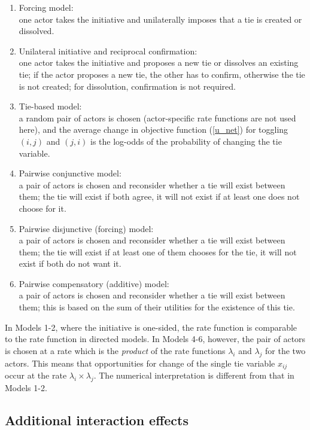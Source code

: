 \documentclass[a4paper,fleqn]{article}
\newcommand{\+}{\, + \,}
\begin{document}
{\begin{enumerate}
\item Forcing model: \\
      one actor takes the initiative and unilaterally
      imposes that a tie is created or dissolved.
\item Unilateral initiative and reciprocal confirmation:\\
      one actor takes the initiative and proposes a new tie
      or dissolves an existing tie; if the actor proposes a new tie, the other
      has to confirm, otherwise the tie is not created;
      for dissolution, confirmation is not required.
\item Tie-based model:\\
      a random pair of actors is chosen (actor-specific rate functions
      are not used here),
      and the average change in objective function (\ref{u_net})
      for toggling $(i,j)$ and $(j,i)$
      is the log-odds of the probability of changing the tie variable.
\item Pairwise conjunctive model:\\
      a pair of actors is chosen and reconsider
      whether a tie will exist between them;
      the tie will exist if both agree,
      it will not exist if at least one does not choose for it.
\item Pairwise disjunctive (forcing) model:\\
      a pair of actors is chosen and reconsider
      whether a tie will exist between them;
      the tie will exist if at least one of them chooses for the tie,
      it will not exist if both do not want it.
\item Pairwise compensatory (additive) model:\\
      a pair of actors is chosen and reconsider
      whether a tie will exist between them;
      this is based on the sum of their utilities
      for the existence of this tie.
\end{enumerate}
In Models 1-2, where the initiative is one-sided,
the rate function is comparable to the rate function in directed models.
In Models 4-6, however, the pair of actors is chosen at a rate
which is the \emph{product} of the rate functions
$\lambda_i$ and $\lambda_j$ for the two actors.
This means that opportunities for change of the single tie variable $x_{ij}$
occur at the rate $\lambda_i \times \lambda_j$.
The numerical interpretation is different from that in Models 1-2.
\fi
\hypertarget{T_int_eff}{
\subsection{Additional interaction effects}
}
\label{S_int_eff}

}
\end{document}

